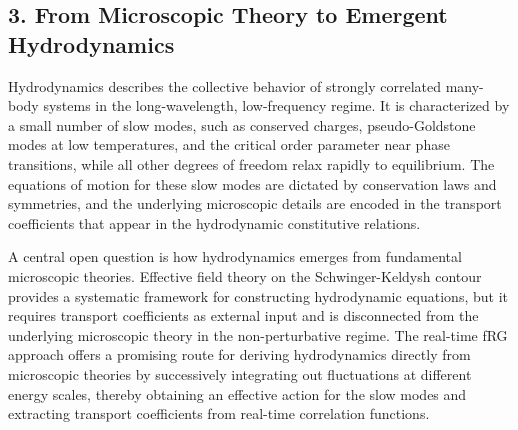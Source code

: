 \documentclass[11pt,a4paper]{article}
\begin{document}
\subsection*{3. From Microscopic Theory to Emergent Hydrodynamics}

Hydrodynamics describes the collective behavior of strongly correlated many-body systems in the long-wavelength, low-frequency regime. It is characterized by a small number of slow modes, such as conserved charges, pseudo-Goldstone modes at low temperatures, and the critical order parameter near phase transitions, while all other degrees of freedom relax rapidly to equilibrium. The equations of motion for these slow modes are dictated by conservation laws and symmetries, and the underlying microscopic details are encoded in the transport coefficients that appear in the hydrodynamic constitutive relations.

A central open question is how hydrodynamics emerges from fundamental microscopic theories. Effective field theory on the Schwinger-Keldysh contour\cite{Crossley:2015evo} provides a systematic framework for constructing hydrodynamic equations, but it requires transport coefficients as external input and is disconnected from the underlying microscopic theory in the non-perturbative regime. The real-time fRG approach offers a promising route for deriving hydrodynamics directly from microscopic theories by successively integrating out fluctuations at different energy scales, thereby obtaining an effective action for the slow modes and extracting transport coefficients from real-time correlation functions.
\end{document}
